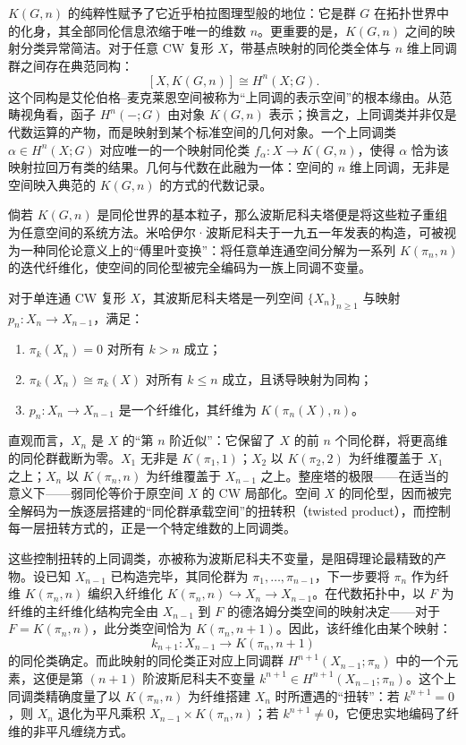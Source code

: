 \documentclass[12pt,a4paper]{article}
\begin{document}
$K(G,n)$ 的纯粹性赋予了它近乎柏拉图理型般的地位：它是群 $G$ 在拓扑世界中的化身，其全部同伦信息浓缩于唯一的维数 $n$。更重要的是，$K(G,n)$ 之间的映射分类异常简洁。对于任意 CW 复形 $X$，带基点映射的同伦类全体与 $n$ 维上同调群之间存在典范同构：
$$
[X,K(G,n)]\cong H^n(X;G).
$$
这个同构是艾伦伯格–麦克莱恩空间被称为“上同调的表示空间”的根本缘由。从范畴视角看，函子 $H^n(-;G)$ 由对象 $K(G,n)$ 表示；换言之，上同调类并非仅是代数运算的产物，而是映射到某个标准空间的几何对象。一个上同调类 $\alpha\in H^n(X;G)$ 对应唯一的一个映射同伦类 $f_\alpha:X\to K(G,n)$，使得 $\alpha$ 恰为该映射拉回万有类的结果。几何与代数在此融为一体：空间的 $n$ 维上同调，无非是空间映入典范的 $K(G,n)$ 的方式的代数记录。

倘若 $K(G,n)$ 是同伦世界的基本粒子，那么波斯尼科夫塔便是将这些粒子重组为任意空间的系统方法。米哈伊尔·波斯尼科夫于一九五一年发表的构造，可被视为一种同伦论意义上的“傅里叶变换”：将任意单连通空间分解为一系列 $K(\pi_n,n)$ 的迭代纤维化，使空间的同伦型被完全编码为一族上同调不变量。

对于单连通 CW 复形 $X$，其波斯尼科夫塔是一列空间 $\{X_n\}_{n\geq 1}$ 与映射 $p_n:X_n\to X_{n-1}$，满足：
\begin{enumerate}
\item $\pi_k(X_n)=0$ 对所有 $k>n$ 成立；
\item $\pi_k(X_n)\cong\pi_k(X)$ 对所有 $k\leq n$ 成立，且诱导映射为同构；
\item $p_n:X_n\to X_{n-1}$ 是一个纤维化，其纤维为 $K(\pi_n(X),n)$。
\end{enumerate}

直观而言，$X_n$ 是 $X$ 的“第 $n$ 阶近似”：它保留了 $X$ 的前 $n$ 个同伦群，将更高维的同伦群截断为零。$X_1$ 无非是 $K(\pi_1,1)$；$X_2$ 以 $K(\pi_2,2)$ 为纤维覆盖于 $X_1$ 之上；$X_n$ 以 $K(\pi_n,n)$ 为纤维覆盖于 $X_{n-1}$ 之上。整座塔的极限——在适当的意义下——弱同伦等价于原空间 $X$ 的 CW 局部化。空间 $X$ 的同伦型，因而被完全解码为一族逐层搭建的“同伦群承载空间”的扭转积（twisted product），而控制每一层扭转方式的，正是一个特定维数的上同调类。

这些控制扭转的上同调类，亦被称为波斯尼科夫不变量，是阻碍理论最精致的产物。设已知 $X_{n-1}$ 已构造完毕，其同伦群为 $\pi_1,\ldots,\pi_{n-1}$，下一步要将 $\pi_n$ 作为纤维 $K(\pi_n,n)$ 编织入纤维化 $K(\pi_n,n)\hookrightarrow X_n\to X_{n-1}$。在代数拓扑中，以 $F$ 为纤维的主纤维化结构完全由 $X_{n-1}$ 到 $F$ 的德洛姆分类空间的映射决定——对于 $F=K(\pi_n,n)$，此分类空间恰为 $K(\pi_n,n+1)$。因此，该纤维化由某个映射：
$$
k_{n+1}:X_{n-1}\longrightarrow K(\pi_n,n+1)
$$
的同伦类确定。而此映射的同伦类正对应上同调群 $H^{n+1}(X_{n-1};\pi_n)$ 中的一个元素，这便是第 $(n+1)$ 阶波斯尼科夫不变量 $k^{n+1}\in H^{n+1}(X_{n-1};\pi_n)$。这个上同调类精确度量了以 $K(\pi_n,n)$ 为纤维搭建 $X_n$ 时所遭遇的“扭转”：若 $k^{n+1}=0$，则 $X_n$ 退化为平凡乘积 $X_{n-1}\times K(\pi_n,n)$；若 $k^{n+1}\neq 0$，它便忠实地编码了纤维的非平凡缠绕方式。
\end{document}
